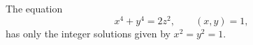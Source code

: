 \begin{proposition}
    The equation
\[
    x^4+y^4=2z^2,\qquad (x,y)=1,
\]
    has only the integer solutions given by $x^2=y^2=1$.
\end{proposition}

